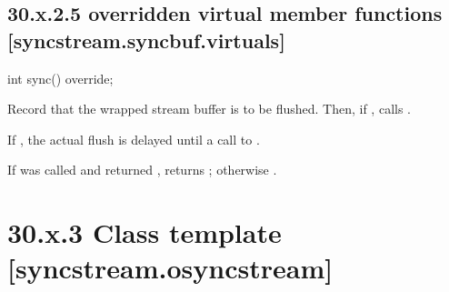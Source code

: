 \documentclass[ebook,11pt,article]{memoir}
\begin{document}
\subsection{30.x.2.5  overridden virtual member functions [syncstream.syncbuf.virtuals]}


\begin{addedblock}
\begin{itemdecl}
int sync() override;
\end{itemdecl}
\begin{itemdescr}
\pnum
\effects 
Record that the wrapped stream buffer is to be flushed. 
Then, if , calls .
\begin{note}
If , the actual flush is delayed until a call to .
\end{note}

\pnum
\returns
If  was called and returned , returns ; otherwise .
\end{itemdescr}

\end{addedblock}

\newpage
\section{30.x.3 Class template  [syncstream.osyncstream] }

\end{document}
